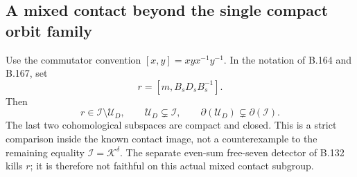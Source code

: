 \subsection*{A mixed contact beyond the single compact orbit family}
\label{stmt:B168}
Use the commutator convention \([x,y]=xyx^{-1}y^{-1}\).
In the notation of B.164 and B.167, set
\[
                     r=[m,B_sD_sB_s^{-1}].
\]
Then
\begin{equation}\label{eq:B168-strict}
 r\in\mathcal I\setminus\mathcal U_D,\qquad
 \mathcal U_D\subsetneq\mathcal I,\qquad
 \partial(\mathcal U_D)\subsetneq\partial(\mathcal I).
\end{equation}
The last two cohomological subspaces are compact and closed.
This is a strict comparison inside the known contact image, not a
counterexample to the remaining equality \(\mathcal I=\mathcal K^\delta\).
The separate even-sum free-seven detector of B.132 kills \(r\);
it is therefore not faithful on this actual mixed contact subgroup.

